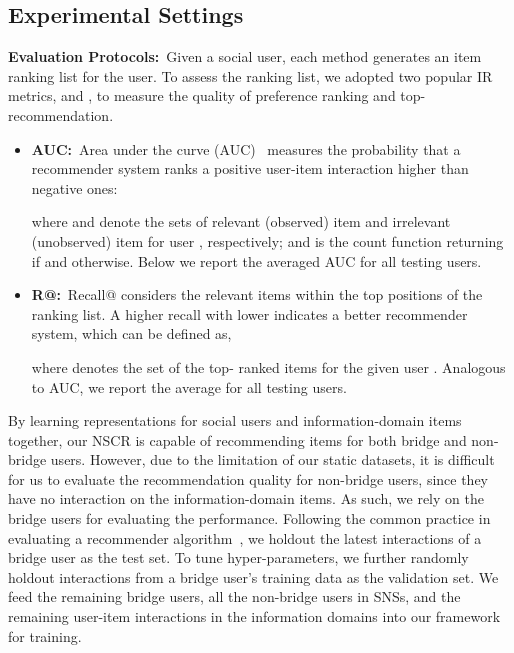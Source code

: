 \documentclass[sigconf]{acmart}
\begin{document}
	\subsection{Experimental Settings}
	\textbf{Evaluation Protocols:}~Given a social user, each method generates an item ranking list for the user.
	To assess the ranking list, we adopted two popular IR metrics,  and , to measure the quality of preference ranking and top- recommendation.
	\begin{itemize}[leftmargin=*]
\item\textbf{AUC:}~Area under the curve (AUC)~\cite{DBLP:conf/uai/RendleFGS09,DBLP:conf/www/HuCXCGZ13} measures the probability that a recommender system ranks a positive user-item interaction higher than negative ones:
		
		where  and  denote the sets of relevant (observed) item  and irrelevant (unobserved) item  for user , respectively; and  is the count function returning  if  and  otherwise. Below we report the averaged AUC for all testing users.
		\item\textbf{R@:}~Recall@ considers the relevant items within the top  positions of the ranking list. A higher recall with lower  indicates a better recommender system, which can be defined as,
		
		where  denotes the set of the top- ranked items for the given user . Analogous to AUC, we report the average  for all testing users.
	\end{itemize}
	
	\noindent By learning representations for social users and information-domain items together, our NSCR is capable of recommending items for both bridge and non-bridge users.
	However, due to the limitation of our static datasets, it is difficult for us to evaluate the recommendation quality for non-bridge users, since they have no interaction on the information-domain items.
	As such, we rely on the bridge users for evaluating the performance.
	Following the common practice in evaluating a recommender algorithm~\cite{heneural,DBLP:conf/uai/RendleFGS09},
	we holdout the latest  interactions of a bridge user as the test set.
	To tune hyper-parameters, we further randomly holdout  interactions from a bridge user's training data as the validation set. We feed the remaining bridge users, all the non-bridge users in SNSs, and the remaining user-item interactions in the information domains into our framework for training.
	
\end{document}
